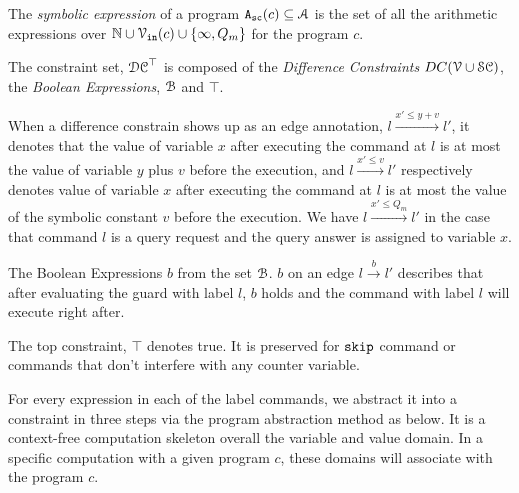 \begin{defn}
 \label{def:adaptfun-symbolic_expr}
 The \emph{symbolic expression} of a program ${\mathtt{A_{sc}}}(c) \subseteq \mathcal{A}$ is the set of all the arithmetic expressions over $\mathbb{N} \cup \mathcal{V}_{\mathtt{in}}(c) \cup \{\infty, Q_m \}$ for the program $c$.
\end{defn}

\begin{defn}[Constraint]
 The constraint set, $\mathcal{DC}^{\top}$ is composed of the \emph{Difference Constraints} $DC(\mathcal{V} \cup \mathcal{SC})$, the \emph{Boolean Expressions}, $\mathcal{B}$ and $\top$.
 \end{defn}
 

When a difference constrain shows up as an edge annotation, $l \xrightarrow{x' \leq y + v} l'$,
it denotes that
the value of variable $x$
after executing the command at $l$ is at most
the value of variable $y$ plus $v$ before the execution,
and $l \xrightarrow{x' \leq v} l'$ respectively denotes value of variable $x$
after executing the command at $l$ is at most
the value of the symbolic constant $v$ before the execution.
We have $l \xrightarrow{x' \leq Q_m} l'$ in the case that command $l$ is a query request and the query answer is assigned to variable $x$.

%

The Boolean Expressions $b$ from the set $\mathcal{B}$.
$b$ on an edge $l \xrightarrow{b} l'$ describes
that after evaluating the guard with label $l$,
$b$ holds and the command with label $l$ will execute right after.
%

The top constraint, $\top$ denotes true. It is preserved for $\mathtt{skip}$ command or commands that don't
interfere with any counter variable.


For every expression in each of the label commands, we abstract it into a constraint in three steps via the program abstraction method as below.
It is a context-free computation skeleton overall the variable and value domain. In a specific computation with a given program $c$, these domains will associate with the program $c$.

